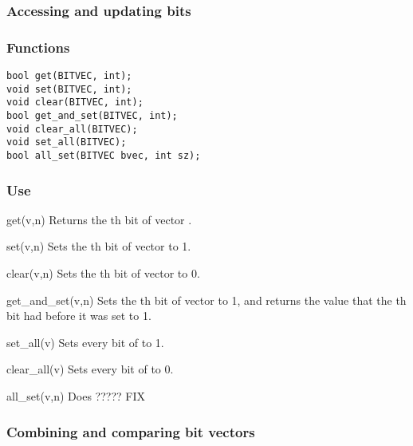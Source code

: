 \subsubsection*{Accessing and updating bits}

\subsubsection*{Functions}
\begin{verbatim}
bool get(BITVEC, int);
void set(BITVEC, int);
void clear(BITVEC, int);
bool get_and_set(BITVEC, int);
void clear_all(BITVEC);
void set_all(BITVEC);
bool all_set(BITVEC bvec, int sz);
\end{verbatim}

\subsubsection*{Use}

\begin{defun}{get}{(v,n)}
Returns the th bit of vector .
\end{defun}

\begin{defun}{set}{(v,n)}
Sets the th bit of vector  to 1.
\end{defun}

\begin{defun}{clear}{(v,n)}
Sets the th bit of vector  to 0.
\end{defun}

\begin{defun}{get_and_set}{(v,n)}
Sets the th bit of vector  to 1, and returns the value
that the th bit had before it was set to 1.
\end{defun}

\begin{defun}{set_all}{(v)}
Sets every bit of  to 1.
\end{defun}

\begin{defun}{clear_all}{(v)}
Sets every bit of  to 0.
\end{defun}

\begin{defun}{all_set}{(v,n)}
Does ?????  FIX
\end{defun}

\subsubsection*{Combining and comparing bit vectors}

